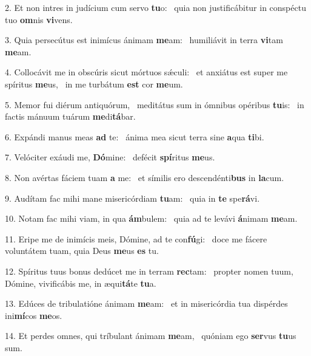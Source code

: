 2. Et non intres in judícium cum servo \textbf{tu}o: \ast\  quia non justificábitur in conspéctu tuo \textbf{om}nis \textbf{vi}vens.\

3. Quia persecútus est inimícus ánimam \textbf{me}am: \ast\  humiliávit in terra \textbf{vi}tam \textbf{me}am.\

4. Collocávit me in obscúris sicut mórtuos sǽculi: \dag\  et anxiátus est super me spíritus \textbf{me}us, \ast\  in me turbátum \textbf{est} cor \textbf{me}um.\

5. Memor fui diérum antiquórum, \dag\  meditátus sum in ómnibus opéribus \textbf{tu}is: \ast\  in factis mánuum tuárum \textbf{me}di\textbf{tá}bar.\

6. Expándi manus meas \textbf{ad} te: \ast\  ánima mea sicut terra sine \textbf{a}qua \textbf{ti}bi.\

7. Velóciter exáudi me, \textbf{Dó}mine: \ast\  defécit \textbf{spí}ritus \textbf{me}us.\

8. Non avértas fáciem tuam \textbf{a} me: \ast\  et símilis ero descendénti\textbf{bus} in \textbf{la}cum.\

9. Audítam fac mihi mane misericórdiam \textbf{tu}am: \ast\  quia in \textbf{te} spe\textbf{rá}vi.\

10. Notam fac mihi viam, in qua \textbf{ám}bulem: \ast\  quia ad te levávi \textbf{á}nimam \textbf{me}am.\

11. Eripe me de inimícis meis, Dómine, ad te con\textbf{fú}gi: \ast\  doce me fácere voluntátem tuam, quia Deus \textbf{me}us \textbf{es} tu.\

12. Spíritus tuus bonus dedúcet me in terram \textbf{rec}tam: \ast\  propter nomen tuum, Dómine, vivificábis me, in æqui\textbf{tá}te \textbf{tu}a.\

13. Edúces de tribulatióne ánimam \textbf{me}am: \ast\  et in misericórdia tua dispérdes ini\textbf{mí}cos \textbf{me}os.\

14. Et perdes omnes, qui tríbulant ánimam \textbf{me}am, \ast\  quóniam ego \textbf{ser}vus \textbf{tu}us sum.\

